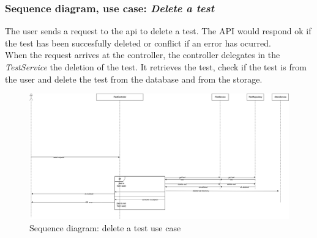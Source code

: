         \subsubsection{Sequence diagram, use case: \textit{Delete a test}}
            The user sends a request to the api to delete a test. The API would respond ok if the test has been succesfully deleted or conflict if an error has ocurred. \\
            When the request arrives at the controller, the controller delegates in the \textit{TestService} the deletion of the test. It retrieves the test, check if the test is from the user and delete the test from the database and from the storage. \\
                \begin{figure}[H]
                    \centering
                        \includegraphics[width=\textwidth]{assets/diagrams/deletetest.png}
                    \caption{Sequence diagram: delete a test use case}
                    \label{fig:implementation_deletetest}
                \end{figure}

